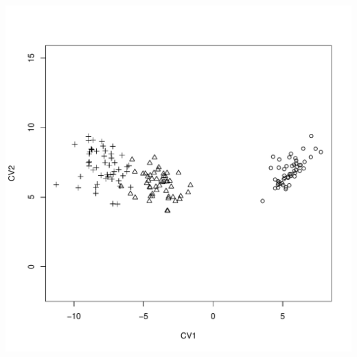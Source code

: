 \documentclass{beamer}
\begin{document}
\begin{frame}
\begin{columns}
\begin{column}{0.5\textwidth}
\begin{center}
\includegraphics[width=\textwidth]{iris-CVA}
\end{center}
\end{column}

\end{columns}
\end{frame}
\end{document}
